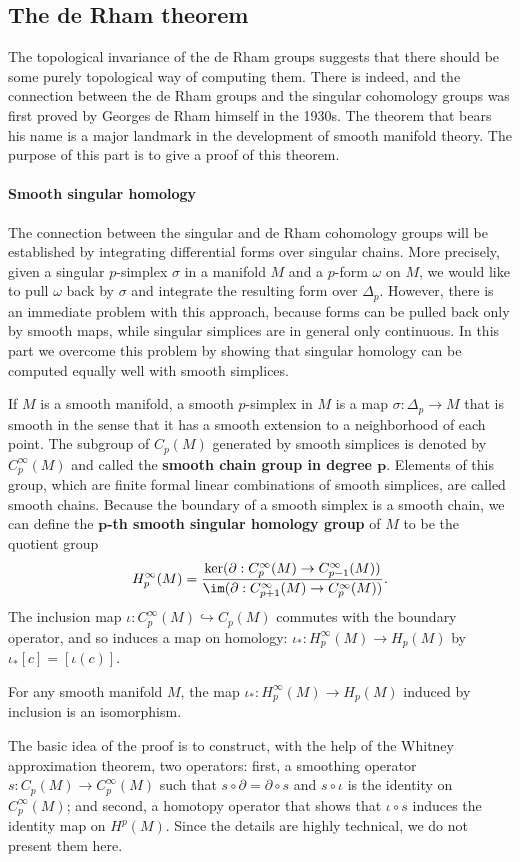 \subsection{The de Rham theorem}
The topological invariance of the de Rham groups suggests that there should be some purely topological way of computing them. There is indeed, and the connection 
between the de Rham groups and the singular cohomology groups was first proved by Georges de Rham himself in the 1930s. The theorem that bears his name is a major 
landmark in the development of smooth manifold theory. The purpose of this part is to give a proof of this theorem.
\paragraph{Smooth singular homology}
The connection between the singular and de Rham cohomology groups will be established by integrating differential forms over singular chains. More precisely, given a 
singular $p$-simplex $\sigma$ in a manifold $M$ and a $p$-form $\omega$ on $M$, we would like to pull $\omega$ back by $\sigma$ and integrate the resulting form over 
$\Delta_p$. However, there is an immediate problem with this approach, because forms can be pulled back only by smooth maps, while singular simplices are in general 
only continuous. In this part we overcome this problem by showing that singular homology can be computed equally well with smooth simplices.\par
If $M$ is a smooth manifold, a smooth $p$-simplex in $M$ is a map $\sigma:\Delta_p\to M$ that is smooth in the sense that it has a smooth extension to a neighborhood 
of each point. The subgroup of $C_p(M)$ generated by smooth simplices is denoted by $C^\infty_p(M)$ and called the \textbf{smooth chain group in degree $\bm{p}$}. 
Elements of this group, which are finite formal linear combinations of smooth simplices, are called smooth chains. Because the boundary of a smooth simplex is a smooth 
chain, we can define the \textbf{$\bm{p}$-th smooth singular homology group} of $M$ to be the quotient group
\[H_p^{\infty}(M)=\frac{\ker(\partial:C_p^{\infty}(M)\to C_{p-1}^{\infty}(M))}{\im(\partial:C_{p+1}^{\infty}(M)\to C_{p}^{\infty}(M))}.\]
The inclusion map $\iota:C^\infty_p(M)\hookrightarrow C_p(M)$ commutes with the boundary operator, and so induces a map on homology: $\iota_*:H_p^{\infty}(M)\to H_p(M)$ 
by $\iota_*[c]=[\iota(c)]$.
\begin{theorem}
For any smooth manifold $M$, the map $\iota_*:H_p^{\infty}(M)\to H_p(M)$ induced by inclusion is an isomorphism.
\end{theorem}
The basic idea of the proof is to construct, with the help of the Whitney approximation theorem, two operators: first, a smoothing operator $s:C_p(M)\to C_p^{\infty}(M)$ 
such that $s\circ\partial=\partial\circ s$ and $s\circ\iota$ is the identity on $C_p^{\infty}(M)$; and second, a homotopy operator that shows that $\iota\circ s$ induces 
the identity map on $H^p(M)$. Since the details are highly technical, we do not present them here.
